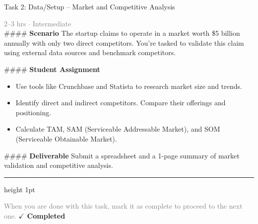 \documentclass[10pt,a4paper]{article}
\begin{document}
\begin{taskbox}{Task 2: Data/Setup – Market and Competitive Analysis}

    {\small \textcolor{gray}{2--3 hrs $\cdot$ Intermediate}}\\[12pt]

    \#\#\#\# \textbf{Scenario}  
The startup claims to operate in a market worth \$5 billion annually with only two direct competitors. You’re tasked to validate this claim using external data sources and benchmark competitors.  

\#\#\#\# \textbf{Student Assignment}  
\begin{itemize}
    \item Use tools like Crunchbase and Statista to research market size and trends.  
    \item Identify direct and indirect competitors. Compare their offerings and positioning.  
    \item Calculate TAM, SAM (Serviceable Addressable Market), and SOM (Serviceable Obtainable Market).  
\end{itemize}

\#\#\#\# \textbf{Deliverable}  
Submit a spreadsheet and a 1-page summary of market validation and competitive analysis.\par

    \vspace{16pt}

    \textcolor{cardBorder}{\hrule height 1pt}\vspace{8pt}

    \small \textcolor{gray}{When you are done with this task, mark it as complete to proceed to the next one.} \hfill \textbf{\textcolor{brandDark}{$\checkmark$ Completed}}

\end{taskbox}
\end{document}
